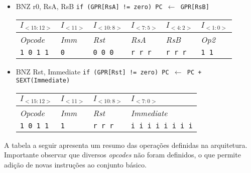 \documentclass{extreport}
\begin{document}
\begin{itemize}
\item BNZ r0, RsA, RsB
\subitem \texttt{if (GPR[RsA] != zero) PC $\leftarrow$ GPR[RsB]}
\begin{table}[ht!]
\centering
\begin{tabular}{|p{1.6cm}|p{1.6cm}|p{1.6cm}|p{1.6cm}|p{1.6cm}|p{1.6cm}|}
\hline
$I_{<15:12>}$ & $I_{<11>}$ & $I_{<10:8>}$ & $I_{<7:5>}$ & $I_{<4:2>}$ & $I_{<1:0>}$ \\ \hline
\textit{Opcode} & \textit{Imm} & \textit{Rst} & \textit{RsA} & \textit{RsB} & \textit{Op2} \\ \hline
\texttt{1 0 1 1} & \texttt{0} & \texttt{0 0 0} & \texttt{r r r} & \texttt{r r r} & \texttt{1 1} \\ \hline
\end{tabular}
\end{table}

\item BNZ Rst, Immediate
\subitem \texttt{if (GPR[Rst] != zero) PC $\leftarrow$ PC + SEXT(Immediate)}
\begin{table}[ht!]
\centering
\begin{tabular}{|p{1.6cm}|p{1.6cm}|p{1.6cm}|p{5.65cm}|}
\hline
$I_{<15:12>}$ & $I_{<11>}$ & $I_{<10:8>}$ & $I_{<7:0>}$ \\ \hline
\textit{Opcode} & \textit{Imm} & \textit{Rst} & \textit{Immediate} \\ \hline
\texttt{1 0 1 1} & \texttt{1} & \texttt{r r r} & \texttt{i i i i i i i i} \\ \hline
\end{tabular}
\end{table}
\end{itemize}

A tabela a seguir apresenta um resumo das operações definidas na arquitetura. Importante observar que diversos \textit{opcodes} não foram definidos, o que permite adição de novas instruções ao conjunto básico.
\end{document}

